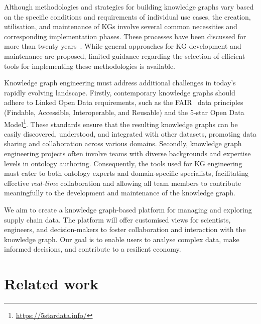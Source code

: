 \documentclass[
hf
]{ceurart}
\begin{document}
Although methodologies and strategies for building knowledge graphs vary based on the specific conditions and requirements of individual use cases, the creation, utilisation, and maintenance of KGs involve several common necessities and corresponding implementation phases. These processes have been discussed for more than twenty years~\cite{Gruninger1995-MethodologyFT, Noy2001-Ontology101, SurezFigueroa2012-TheNeonMethodology, Auer2012-lod-life-cycle}. While general approaches for KG development and maintenance are proposed, limited guidance regarding the selection of efficient tools for implementing these methodologies is available.


Knowledge graph engineering must address additional challenges in today's rapidly evolving landscape. Firstly, contemporary knowledge graphs should adhere to Linked Open Data requirements, such as the FAIR~\cite{wilkinson2016fair} data principles (Findable, Accessible, Interoperable, and Reusable) and the 5-star Open Data Model\footnote{\url{https://5stardata.info/}}. These standards ensure that the resulting knowledge graphs can be easily discovered, understood, and integrated with other datasets, promoting data sharing and collaboration across various domains. Secondly, knowledge graph engineering projects often involve teams with diverse backgrounds and expertise levels in ontology authoring. Consequently, the tools used for KG engineering must cater to both ontology experts and domain-specific specialists, facilitating effective \emph{real-time} collaboration and allowing all team members to contribute meaningfully to the development and maintenance of the knowledge graph.

We aim to create a knowledge graph-based platform for managing and exploring supply chain data. The platform will offer customised views for scientists, engineers, and decision-makers to foster collaboration and interaction with the knowledge graph. Our goal is to enable users to analyse complex data, make informed decisions, and contribute to a resilient economy.



\section{Related work}
\end{document}
